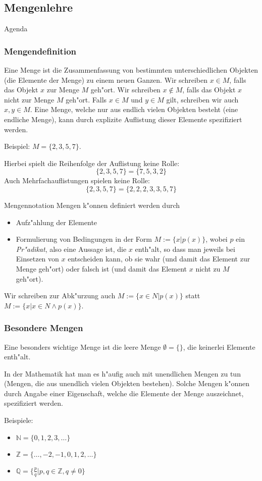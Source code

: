 \documentclass{beamer}
\begin{document}
\subsection{Mengenlehre}
\begin{frame}{Agenda}
   
    
  \tableofcontents[currentsection]
  \end{frame}
\begin{frame}
  \frametitle{Mengendefinition}
  \begin{definition}
    Eine Menge ist die Zusammenfassung von bestimmten unterschiedlichen
    Objekten (die Elemente der Menge) zu einem neuen Ganzen.
    Wir schreiben $x\in M$, falls das Objekt $x$ zur Menge $M$ geh"ort.
    Wir schreiben $x\notin M$, falls das Objekt $x$ nicht zur Menge $M$ geh"ort.
    Falls $x\in M$ und $y\in M$ gilt, schreiben wir auch $x, y \in M$.
    Eine Menge, welche nur aus endlich vielen Objekten besteht (eine endliche
    Menge), kann durch explizite Auflistung dieser Elemente spezifiziert
    werden.
  \end{definition}
    Beispiel: $M=\{2,3,5,7\}$.

    Hierbei spielt die Reihenfolge der Auflistung keine Rolle:
    \[\{2,3,5,7\}=\{7,5,3,2\}\]
    Auch Mehrfachauflistungen spielen keine Rolle:
    \[\{2,3,5,7\}=\{2,2,2,3,3,5,7\}\]
  \end{frame}

\begin{frame}{Mengennotation}
Mengen k"onnen definiert werden durch
\begin{itemize}
  \item Aufz"ahlung der Elemente
  \item Formulierung von Bedingungen in der Form $M:=\{x|p(x)\}$, wobei $p$ ein \textit{Pr"adikat}, also eine Aussage ist, die $x$ enth"alt, so dass man jeweils bei Einsetzen von $x$ entscheiden kann, ob sie wahr (und damit das Element zur Menge geh"ort) oder falsch ist (und damit das Element $x$ nicht zu $M$ geh"ort).
\end{itemize}
  Wir schreiben zur Abk"urzung auch $M:=\{x\in N|p(x)\}$ statt $M:=\{x|x\in N\wedge p(x)\}$.
\end{frame}
\begin{frame}
  \frametitle{Besondere Mengen}
  Eine besonders wichtige Menge ist die leere Menge $\emptyset = \{\}$, die keinerlei
Elemente enth"alt.

In der Mathematik hat man es h"aufig auch mit unendlichen Mengen zu
tun (Mengen, die aus unendlich vielen Objekten bestehen).
Solche Mengen k"onnen durch Angabe einer Eigenschaft, welche die
Elemente der Menge auszeichnet, spezifiziert werden.

Beispiele:
\begin{itemize}
  \item $\mathbb{N}=\{0,1,2,3,\dots\}$
  \item $\mathbb{Z}=\{\dots,-2,-1,0,1,2,\dots\}$
  \item $\mathbb{Q}=\{\frac{p}{q}|p,q\in\mathbb{Z}, q\neq 0\}$
  
\end{itemize}
\end{frame}
\end{document}
